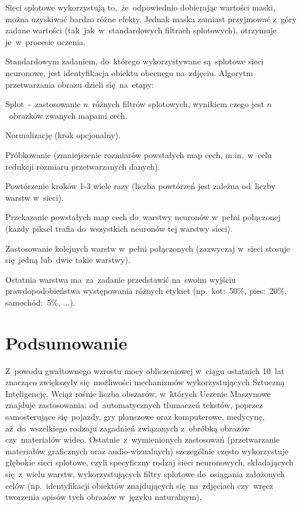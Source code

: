 \documentclass[oneside, 11pt, a4paper]{article}
\begin{document}
\begin{multicols}{2}
Sieci splotowe wykorzystują to,~że~odpowiednio dobierając wartości maski, można uzyskiwać bardzo różne efekty. Jednak maska zamiast przyjmować z~góry zadane wartości (tak~jak~w~standardowych filtrach splotowych), otrzymuje je~w~procesie uczenia.

Standardowym zadaniem, do~którego wykorzystywane są~splotowe sieci neuronowe, jest identyfikacja obiektu obecnego na~zdjęciu. Algorytm przetwarzania obrazu dzieli się~na~etapy:
\begin{compactenum}
	\item Splot~-~zastosowanie $n$~różnych filtrów splotowych, wynikiem czego jest $n$~obrazków zwanych mapami cech.
	\item Normalizację (krok opcjonalny).
	\item Próbkowanie (zmniejszenie rozmiarów powstałych map cech, m.in.~w~celu redukcji rozmiaru przetwarzanych danych).
	\item Powtórzenie kroków 1-3 wiele razy (liczba powtórzeń jest zależna od~liczby warstw w~sieci).
	\item Przekazanie powstałych map cech do~warstwy neuronów w~pełni połączonej (każdy piksel trafia do~wszystkich neuronów tej warstwy sieci).
	\item Zastosowanie kolejnych warstw w~pełni połączonych (zazwyczaj w~sieci stosuje się~jedną lub~dwie takie warstwy).
\end{compactenum}

Ostatnia warstwa ma~za~zadanie przedstawić na~swoim wyjściu prawdopodobieństwa występowania różnych etykiet (np.~kot:~50\%, pies:~20\%, samochód:~5\%, ...).

\section{Podsumowanie}
Z~powodu gwałtownego wzrostu mocy obliczeniowej w~ciągu ostatnich 10~lat znacząco zwiększyły się~możliwości mechanizmów wykorzystujących Sztuczną Inteligencję. Wciąż rośnie liczba obszarów, w~których Uczenie Maszynowe znajduje zastosowania: od~automatycznych tłumaczeń tekstów, poprzez samosterujące się~pojazdy, gry planszowe oraz komputerowe, medycynę, aż~do~wszelkiego rodzaju zagadnień związanych z~obróbką obrazów czy~materiałów wideo. Ostatnie~z~wymienionych zastosowań (przetwarzanie materiałów graficznych oraz audio-wizualnych) szczególnie często wykorzystuje głębokie sieci splotowe, czyli specyficzny rodzaj sieci neuronowych, składających się~z~wielu warstw, wykorzystujących filtry splotowe do~osiągania założonych celów (np.~identyfikacji obiektów znajdujących się~na~zdjęciach czy~wręcz tworzenia opisów tych obrazów w~języku naturalnym).


\end{multicols}
\end{document}
